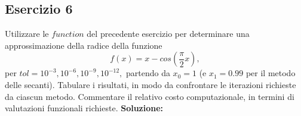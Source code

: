 \subsection{Esercizio 6}
Utilizzare le $function$ del precedente esercizio per determinare una approssimazione
della radice della funzione
\[
        f(x) = x - cos(\frac{\pi}{2}x),
\]
per $tol = 10^{-3}, 10^{-6}, 10^{-9}, 10^{-12},$ partendo da $x_0 = 1$
(e $x_1 = 0.99$ per il metodo delle secanti). Tabulare i risultati,
in modo da confrontare le iterazioni richieste da ciascun metodo. Commentare
il relativo costo computazionale, in termini di valutazioni funzionali richieste.
\newline \textbf{Soluzione:}








